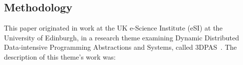 %
%
%
%
%
%
%
%
%
%
%
%


\subsection{Methodology}

This paper originated in work at the UK e-Science Institute (eSI) at
the University of Edinburgh, in a research theme examining Dynamic
Distributed Data-intensive Programming Abstractions and Systems,
called 3DPAS~\cite{3dpas-theme}.  The description of
this theme's work was:

